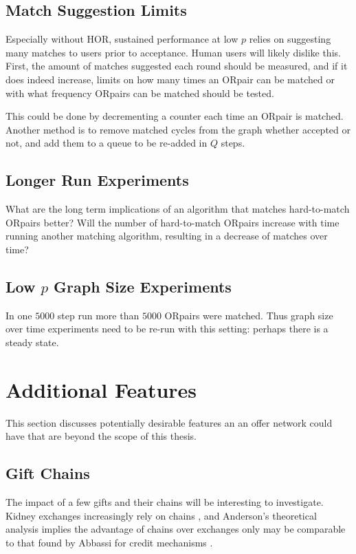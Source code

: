 \documentclass[main.tex]{subfiles}
\begin{document}
\subsection{Match Suggestion Limits}
Especially without HOR, sustained performance at low $p$ relies on suggesting many matches to users prior to acceptance. Human users will likely dislike this. First, the amount of matches suggested each round should be measured, and if it does indeed increase, limits on how many times an ORpair can be matched or with what frequency ORpairs can be matched should be tested.

This could be done by decrementing a counter each time an ORpair is matched. Another method is to remove matched cycles from the graph whether accepted or not, and add them to a queue to be re-added in $Q$ steps.

\subsection{Longer Run Experiments}
What are the long term implications of an algorithm that matches hard-to-match ORpairs better? Will the number of hard-to-match ORpairs increase with time running another matching algorithm, resulting in a decrease of matches over time?

\subsection{Low $p$ Graph Size Experiments}
In one $5000$ step run more than $5000$ ORpairs were matched. Thus graph size over time experiments need to be re-run with this setting: perhaps there is a steady state.


\section{Additional Features}
This section discusses potentially desirable features an an offer network could have that are beyond the scope of this thesis.

\subsection{Gift Chains}

The impact of a few gifts and their chains will be interesting to investigate. Kidney exchanges increasingly rely on chains \cite{Dick}, and Anderson's theoretical analysis \cite{And1} implies the advantage of chains over exchanges only may be comparable to that found by Abbassi for credit mechanisms \cite{Abb2}.
\end{document}
